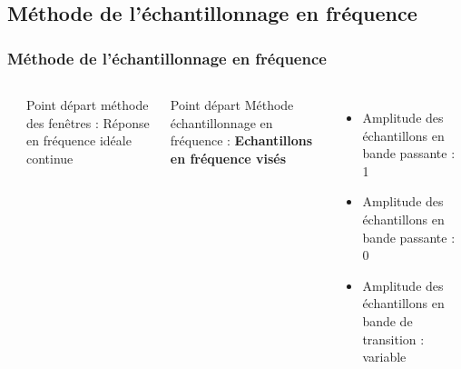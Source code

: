 \documentclass{beamer}
\begin{document}
\subsection{Méthode de l'échantillonnage en fréquence}
\begin{frame}
\frametitle{Méthode de l'échantillonnage en fréquence}
\begin{columns}
\column{60mm}
\begin{center}
\end{center}

\column{60mm}
Point départ méthode des fenêtres : Réponse en fréquence idéale continue \\

\vspace{0.5cm}

Point départ Méthode échantillonnage en fréquence : \textbf{Echantillons en fréquence visés}\\
\vspace{0.2cm}
\begin{itemize}
\item<2-> Amplitude des échantillons en bande passante : 1
\item<3-> Amplitude des échantillons en bande passante : 0
\item<4-> Amplitude des échantillons en bande de transition : variable
\end{itemize}

\end{columns}

\end{frame}
\end{document}
